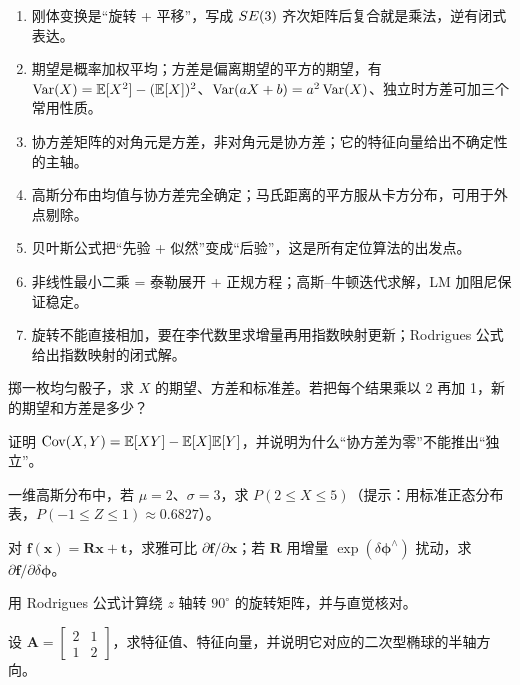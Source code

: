 \begin{summary}

\begin{enumerate}
  \item 刚体变换是“旋转 + 平移”，写成 $SE(3)$ 齐次矩阵后复合就是乘法，逆有闭式表达。
  \item 期望是概率加权平均；方差是偏离期望的平方的期望，有 $\operatorname{Var}(X)=\mathbb{E}[X^{2}]-(\mathbb{E}[X])^{2}$、$\operatorname{Var}(aX+b)=a^{2}\operatorname{Var}(X)$、独立时方差可加三个常用性质。
  \item 协方差矩阵的对角元是方差，非对角元是协方差；它的特征向量给出不确定性的主轴。
  \item 高斯分布由均值与协方差完全确定；马氏距离的平方服从卡方分布，可用于外点剔除。
  \item 贝叶斯公式把“先验 + 似然”变成“后验”，这是所有定位算法的出发点。
  \item 非线性最小二乘 = 泰勒展开 + 正规方程；高斯--牛顿迭代求解，LM 加阻尼保证稳定。
  \item 旋转不能直接相加，要在李代数里求增量再用指数映射更新；Rodrigues 公式给出指数映射的闭式解。
\end{enumerate}

\end{summary}

\begin{problemset}

  \item 掷一枚均匀骰子，求 $X$ 的期望、方差和标准差。若把每个结果乘以 2 再加 1，新的期望和方差是多少？
  \item 证明 $\operatorname{Cov}(X,Y)=\mathbb{E}[XY]-\mathbb{E}[X]\mathbb{E}[Y]$，并说明为什么“协方差为零”不能推出“独立”。
  \item 一维高斯分布中，若 $\mu=2$、$\sigma=3$，求 $P(2\le X\le 5)$（提示：用标准正态分布表，$P(-1\le Z\le1)\approx0.6827$）。
  \item 对 $\bm{f}(\bm{x})=\bm{R}\bm{x}+\bm{t}$，求雅可比 $\partial\bm{f}/\partial\bm{x}$；若 $\bm{R}$ 用增量 $\exp(\delta\bm{\phi}^{\wedge})$ 扰动，求 $\partial\bm{f}/\partial\delta\bm{\phi}$。
  \item 用 Rodrigues 公式计算绕 $z$ 轴转 $90^\circ$ 的旋转矩阵，并与直觉核对。
  \item 设 $\bm{A}=\begin{bmatrix}2&1\\1&2\end{bmatrix}$，求特征值、特征向量，并说明它对应的二次型椭球的半轴方向。
\end{problemset}

